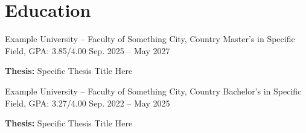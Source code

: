 \section{Education}
\resumeEntry
    {Example University -- Faculty of Something}
    {City, Country}
    {Master's in Specific Field, GPA: 3.85/4.00}
    {Sep. 2025 -- May 2027}

\begin{resumeBullets}
    \item \textbf{Thesis:} Specific Thesis Title Here
\end{resumeBullets}
\resumeEntry
    {Example University -- Faculty of Something}
    {City, Country}
    {Bachelor's in Specific Field, GPA: 3.27/4.00}
    {Sep. 2022 -- May 2025}

\begin{resumeBullets}
    \item \textbf{Thesis:} Specific Thesis Title Here
\end{resumeBullets}

